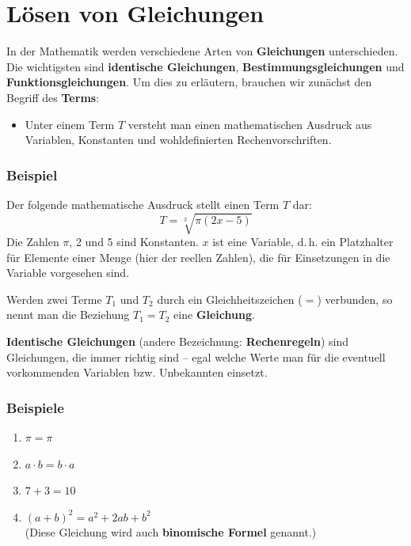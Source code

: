 \section{Lösen von Gleichungen}

In der Mathematik werden verschiedene Arten von \textbf{Gleichungen} unterschieden. Die wichtigsten sind \textbf{identische Gleichungen}, \textbf{Bestimmungsgleichungen} und \textbf{Funktionsgleichungen}. Um dies zu erläutern, brauchen wir zunächst den Begriff des \textbf{Terms}:
\begin{itemize}
  \item Unter einem Term $T$ versteht man einen mathematischen Ausdruck aus Variablen, Konstanten und wohldefinierten Rechenvorschriften.
\end{itemize}

\subsubsection{Beispiel}

Der folgende mathematische Ausdruck stellt einen Term $T$ dar:
\[ T = \sqrt[3]{\pi(2x - 5)} \]
Die Zahlen $\pi$, 2 und 5 sind Konstanten. $x$ ist eine Variable, d.\,h. ein Platzhalter für Elemente einer Menge (hier der reellen Zahlen), die für Einsetzungen in die Variable vorgesehen sind.\beispielende

Werden zwei Terme $T_1$ und $T_2$ durch ein Gleichheitszeichen ($=$) verbunden, so nennt man die Beziehung $T_1 = T_2$ eine \textbf{Gleichung}.

\textbf{Identische Gleichungen} (andere Bezeichnung: \textbf{Rechenregeln}) sind Gleichungen, die immer richtig sind -- egal welche Werte man für die eventuell vorkommenden Variablen bzw. Unbekannten einsetzt.

\subsubsection{Beispiele}

\begin{enumerate}[label=\alph*)]
  \item $\pi = \pi$
  \item $a \cdot b = b \cdot a$
  \item $7 + 3 = 10$
  \item $(a+b)^2 = a^2 + 2ab + b^2$\\
    (Diese Gleichung wird auch \textbf{binomische Formel} genannt.)\beispielende
\end{enumerate}

